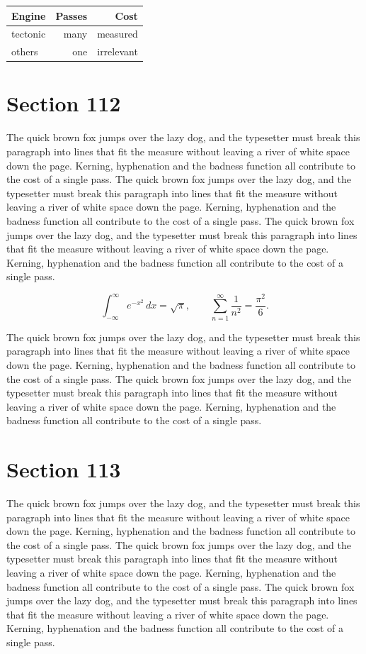 \documentclass{article}
\begin{document}
\begin{center}
\begin{tabular}{lrr}
\toprule
Engine & Passes & Cost \\
\midrule
tectonic & many & measured \\
others & one & irrelevant \\
\bottomrule
\end{tabular}
\end{center}

\section{Section 112}
The quick brown fox jumps over the lazy dog, and the typesetter must break this paragraph into lines that fit the measure without leaving a river of white space down the page. Kerning, hyphenation and the badness function all contribute to the cost of a single pass. The quick brown fox jumps over the lazy dog, and the typesetter must break this paragraph into lines that fit the measure without leaving a river of white space down the page. Kerning, hyphenation and the badness function all contribute to the cost of a single pass. The quick brown fox jumps over the lazy dog, and the typesetter must break this paragraph into lines that fit the measure without leaving a river of white space down the page. Kerning, hyphenation and the badness function all contribute to the cost of a single pass. 

\begin{equation}
\int_{-\infty}^{\infty} e^{-x^{2}}\,dx = \sqrt{\pi}, \qquad
\sum_{n=1}^{\infty} \frac{1}{n^{2}} = \frac{\pi^{2}}{6}.
\end{equation}

The quick brown fox jumps over the lazy dog, and the typesetter must break this paragraph into lines that fit the measure without leaving a river of white space down the page. Kerning, hyphenation and the badness function all contribute to the cost of a single pass. The quick brown fox jumps over the lazy dog, and the typesetter must break this paragraph into lines that fit the measure without leaving a river of white space down the page. Kerning, hyphenation and the badness function all contribute to the cost of a single pass. 
\section{Section 113}
The quick brown fox jumps over the lazy dog, and the typesetter must break this paragraph into lines that fit the measure without leaving a river of white space down the page. Kerning, hyphenation and the badness function all contribute to the cost of a single pass. The quick brown fox jumps over the lazy dog, and the typesetter must break this paragraph into lines that fit the measure without leaving a river of white space down the page. Kerning, hyphenation and the badness function all contribute to the cost of a single pass. The quick brown fox jumps over the lazy dog, and the typesetter must break this paragraph into lines that fit the measure without leaving a river of white space down the page. Kerning, hyphenation and the badness function all contribute to the cost of a single pass. 
\end{document}
